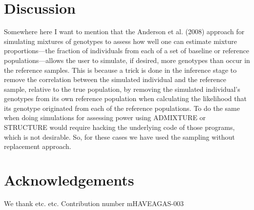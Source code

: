 \section*{Discussion}

Somewhere here I want to mention that the Anderson et al. (2008) approach for simulating
mixtures of genotypes to assess how well one can estimate mixture proportions---the fraction
of individuals from each of a set of baseline or reference populations---allows the user to
simulate, if desired, more genotypes than occur in the reference samples.  This is because
a trick is done in the inference stage to remove the correlation between the simulated individual
and the reference sample, relative to the true population, by removing the simulated individual's
genotypes from its own reference population when calculating the likelihood that its genotype
originated from each of the reference populations.  To do the same when doing simulations for
assessing power using ADMIXTURE or STRUCTURE would require hacking the underlying code
of those programs, which is not desirable.  So, for these cases we have used the sampling
without replacement approach.



\section*{Acknowledgements}
We thank etc. etc.   Contribution number  mHAVEAGAS-003
